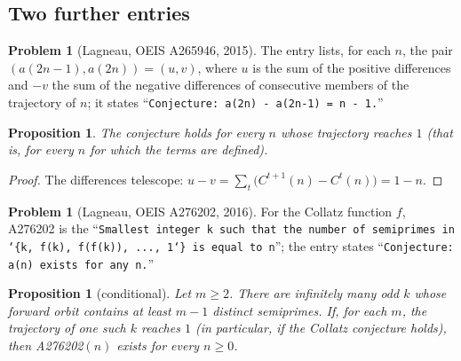 \documentclass[11pt,a4paper]{article}
\newtheorem{proposition}[theorem]{Proposition}
\theoremstyle{definition}
\newtheorem{problem}[theorem]{Problem}
\theoremstyle{remark}
\numberwithin{equation}{section}
\begin{document}
\subsection{Two further entries}

\begin{problem}[Lagneau, OEIS A265946, 2015]\label{B:P:prob:A265946}
The entry \cite{R043} lists, for each $n$, the pair
$(a(2n-1),a(2n))=(u,v)$, where $u$ is the sum of the positive differences and
$-v$ the sum of the negative differences of consecutive members of the
trajectory of $n$; it states ``\texttt{Conjecture: a(2n) - a(2n-1) = n - 1.}''
\end{problem}

\begin{proposition}\label{B:P:prop:A265946}
The conjecture holds for every $n$ whose trajectory reaches $1$ (that is, for
every $n$ for which the terms are defined).
\end{proposition}

\begin{proof}
The differences telescope: $u-v=\sum_t\bigl(C^{t+1}(n)-C^t(n)\bigr)=1-n$.
\end{proof}

\begin{problem}[Lagneau, OEIS A276202, 2016]\label{B:P:prob:A276202}
For the Collatz function $f$, A276202 \cite{R041} is the ``\texttt{Smallest integer
k such that the number of semiprimes in \char`\{k, f(k), f(f(k)), ..., 1\char`\}{} is equal to
n}''; the entry states ``\texttt{Conjecture: a(n) exists for any n.}''
\end{problem}

\begin{proposition}[conditional]\label{B:P:prop:A276202}
Let $m\ge2$. There are infinitely many odd $k$ whose forward orbit contains at
least $m-1$ distinct semiprimes. If, for each $m$, the trajectory of one such
$k$ reaches $1$ (in particular, if the Collatz conjecture holds), then
A276202$(n)$ exists for every $n\ge0$.
\end{proposition}
\end{document}
